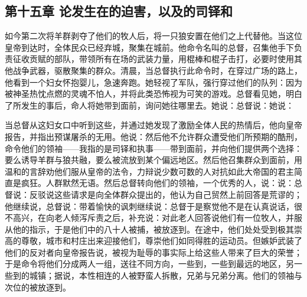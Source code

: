 
\subsection{第十五章 论发生在的迫害，以及的司铎和}

如今第二次将羊群剥夺了他们的牧人后，将一只狼安置在他们之上代替他。当这位皇帝到达时，全体民众已经弃城，聚集在城前。他命令名叫的总督，召集他手下负责征收贡赋的部队，带领所有在场的武装力量，用棍棒和棍子击打，必要时使用其他战争武器，驱散聚集的群众。清晨，当总督执行此命令时，在穿过广场的路上，他看到一个妇女怀抱婴儿，急速奔跑。她轻视了军队，强行穿过他们的队列：因为被神圣热忱点燃的灵魂不怕人，并将此类恐怖视为可笑的游戏。总督看见她，明白了所发生的事后，命人将她带到面前，询问她往哪里去。她说：总督说：她说：\par

当总督从这妇女口中听到这些，并通过她发现了激励全体人民的热情后，他向皇帝报告，并指出预谋屠杀的无用。他说：然后他不允许群众遭受他们所预期的酷刑，命令他们的领袖——我指的是司铎和执事——带到面前，并向他们提供两个选择：要么诱导羊群与狼共融，要么被流放到某个偏远地区。然后他召集群众到面前，用温和的言辞劝他们服从皇帝的法令，力辩说少数可数的人对抗如此大帝国的君主简直是疯狂。人群默然无语。然后总督转向他们的领袖，一个优秀的人，说：说：总督说：反驳说这些请求是向全体群众提出的，他认为自己贸然上前回答是荒谬的；他继续说，总督说：带着愉快的讽刺继续说：总督于是察觉他不是在认真说话，很不高兴，在向老人倾泻斥责之后，补充说：对此老人回答说他们有一位牧人，并服从他的指示，于是他们中的八十人被捕，被放逐到。在途中，他们处处受到极其崇高的尊敬，城市和村庄出来迎接他们，尊崇他们如同得胜的运动员。但嫉妒武装了他们的反对者向皇帝报告说，被视为耻辱的事实际上给这些人带来了巨大的荣誉；于是命令将他们分成两人一组，送往不同方向，一些到，一些到最远的地区，另一些到的城镇；据说，本性相连的人被野蛮人拆散，兄弟与兄弟分离。他们的领袖与次位的被放逐到。\par

